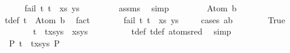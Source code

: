 \begin{isabellebody}
\ \ \ \ \isamarkupfalse%
\ {\isachardoublequoteopen}fail\ {\isacharparenleft}{\kern0pt}{\isacharparenleft}{\kern0pt}t{}{\isacharcomma}{\kern0pt}\ t{}{\isacharparenright}{\kern0pt}\ {\isacharhash}{\kern0pt}\ xs{\isacharcomma}{\kern0pt}\ ys{\isacharparenright}{\kern0pt}{\isachardoublequoteclose}\ \isanewline
\ \ \ \ \ \ \isamarkupfalse%
\ assms\ \isamarkupfalse%
\ simp\isanewline
\ \ \isamarkupfalse%
\isanewline
\ \ \ \ \isamarkupfalse%
\ {\isacharparenleft}{\kern0pt}Atom\ b{\isacharparenright}{\kern0pt}\isanewline
\ \ \ \ \isamarkupfalse%
\ t{}{\isacharunderscore}{\kern0pt}def{\isacharcolon}{\kern0pt}\ {\isachardoublequoteopen}t{}\ {\isacharequal}{\kern0pt}\ Atom\ b{\isachardoublequoteclose}\ \isamarkupfalse%
\ fact\isanewline
\ \ \ \ \isamarkupfalse%
\ \isamarkupfalse%
\ {\isachardoublequoteopen}fail\ {\isacharparenleft}{\kern0pt}{\isacharparenleft}{\kern0pt}t{}{\isacharcomma}{\kern0pt}\ t{}{\isacharparenright}{\kern0pt}\ {\isacharhash}{\kern0pt}\ xs{\isacharcomma}{\kern0pt}\ ys{\isacharparenright}{\kern0pt}{\isachardoublequoteclose}\isanewline
\ \ \ \ \isamarkupfalse%
{\isacharparenleft}{\kern0pt}cases\ {\isachardoublequoteopen}a{\isacharequal}{\kern0pt}b{\isachardoublequoteclose}{\isacharparenright}{\kern0pt}\isanewline
\ \ \ \ \ \ \isamarkupfalse%
\ True\isanewline
\ \ \ \ \ \ \isamarkupfalse%
\ {\isachardoublequoteopen}{\isacharparenleft}{\kern0pt}{\isacharparenleft}{\kern0pt}t{}\ {\isasymapprox}{\isacharquery}{\kern0pt}\ t{}{\isacharparenright}{\kern0pt}{\isacharhash}{\kern0pt}xs{\isacharcomma}{\kern0pt}ys{\isacharparenright}{\kern0pt}\ {\isasymturnstile}{\isacharbrackleft}{\kern0pt}{\isacharbrackright}{\kern0pt}{\isasymleadsto}\ {\isacharparenleft}{\kern0pt}xs{\isacharcomma}{\kern0pt}ys{\isacharparenright}{\kern0pt}{\isachardoublequoteclose}\isanewline
\ \ \ \ \ \ \ \ \isamarkupfalse%
\ t{}{\isacharunderscore}{\kern0pt}def\ t{}{\isacharunderscore}{\kern0pt}def\ atom{\isacharunderscore}{\kern0pt}sred\ \isamarkupfalse%
\ simp\isanewline
\ \ \ \ \ \ \isamarkupfalse%
\ {\isachardoublequoteopen}{\isasymexists}\ P{}{\isachardot}{\kern0pt}\ {\isacharparenleft}{\kern0pt}{\isacharparenleft}{\kern0pt}t{}\ {\isasymapprox}{\isacharquery}{\kern0pt}\ t{}{\isacharparenright}{\kern0pt}{\isacharhash}{\kern0pt}xs{\isacharcomma}{\kern0pt}ys{\isacharparenright}{\kern0pt}\ {\isasymTurnstile}{\isacharparenleft}{\kern0pt}{\isacharbraceleft}{\kern0pt}{\isacharbraceright}{\kern0pt}{\isacharcomma}{\kern0pt}{\isacharbrackleft}{\kern0pt}{\isacharbrackright}{\kern0pt}{\isacharparenright}{\kern0pt}{\isasymRightarrow}P{}{\isachardoublequoteclose}\isanewline

\end{isabellebody}
